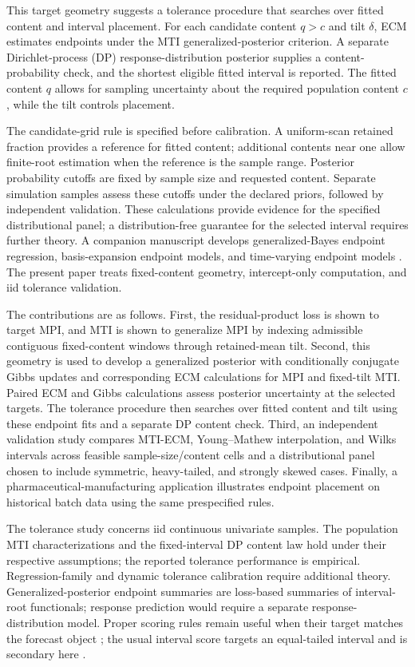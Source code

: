 \documentclass[11pt]{article}
\numberwithin{equation}{section}
\begin{document}
This target geometry suggests a tolerance procedure that searches over fitted
content and interval placement. For each candidate content \(q>c\) and tilt
\(\delta\), ECM estimates endpoints under the
MTI generalized-posterior criterion. A separate Dirichlet-process (DP)
response-distribution posterior supplies a content-probability check, and the
shortest eligible fitted interval is reported.
The fitted content \(q\) allows for sampling uncertainty about the required
population content \(c\), while the tilt controls placement.

The candidate-grid rule is specified before calibration. A uniform-scan retained
fraction provides a reference for fitted content; additional contents near one
allow finite-root estimation when the reference is the sample range.
Posterior probability cutoffs are fixed by sample size and requested content.
Separate simulation samples assess these cutoffs under the declared priors,
followed by independent validation. These calculations provide evidence for the
specified distributional panel; a distribution-free guarantee for the selected
interval requires further theory. A companion
manuscript develops generalized-Bayes endpoint regression, basis-expansion
endpoint models, and time-varying endpoint models
\citep{DeLeonPradoSanso2026MTIExtensions}. The present paper treats
fixed-content geometry, intercept-only computation, and iid tolerance validation.

The contributions are as follows. First, the residual-product loss is shown to
target MPI, and MTI is shown to generalize MPI by indexing admissible contiguous
fixed-content windows through retained-mean tilt. Second, this geometry is used
to develop a generalized posterior with conditionally conjugate Gibbs updates
and corresponding ECM calculations for MPI and fixed-tilt MTI. Paired ECM
and Gibbs calculations assess posterior uncertainty at the selected targets.
The tolerance
procedure then searches over fitted content and tilt using these endpoint fits
and a separate DP content check.
Third, an independent validation study compares MTI-ECM,
Young--Mathew interpolation, and Wilks
intervals across feasible sample-size/content cells and a distributional panel
chosen to include symmetric, heavy-tailed, and strongly skewed cases.
Finally, a pharmaceutical-manufacturing application illustrates endpoint
placement on historical batch data using the same prespecified rules.

The tolerance study concerns iid continuous univariate samples. The population
MTI characterizations and the fixed-interval DP content law hold under their
respective assumptions; the reported tolerance performance is empirical.
Regression-family and dynamic tolerance
calibration require additional theory. Generalized-posterior endpoint summaries
are loss-based summaries of interval-root functionals; response prediction would
require a separate response-distribution model. Proper scoring rules remain useful when their target matches the
forecast object \citep{GneitingRaftery2007,Gneiting2011,GneitingKatzfuss2014};
the usual interval score targets an equal-tailed interval and is secondary here
\citep{BrehmerGneiting2021Intervals}.
\end{document}
